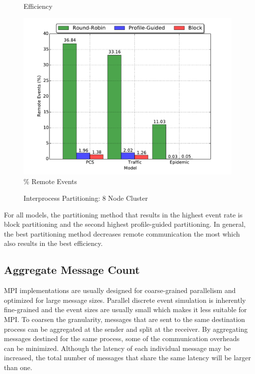 \documentclass[11pt]{book}
\begin{document}
\begin{figure}
\begin{minipage}{.5\textwidth}
\begin{center}
      Efficiency \\
    \end{center}
  \end{minipage}
  \centering
  \begin{minipage}{.5\textwidth}
    \begin{center}
      \includegraphics[width=\textwidth,keepaspectratio,quiet]{figs/partitioning_communication/partitioning_premote_8node.pdf} \\
      \% Remote Events \\
    \end{center}
  \end{minipage}
  \caption{Interprocess Partitioning: 8 Node Cluster}\label{partitioning_8node}
\end{figure}

For all models, the partitioning method that results in the highest event rate is block partitioning
and the second highest profile-guided partitioning.  In general, the best partitioning method
decreases remote communication the most which also results in the best efficiency.

\subsection{Aggregate Message Count}

MPI implementations are usually designed for coarse-grained parallelism and optimized for
large message sizes.  Parallel discrete event simulation is inherently fine-grained and the
event sizes are usually  small which makes it less suitable for MPI.  To coarsen the granularity,
messages that are sent to the same destination process can be aggregated at the sender and
split at the receiver.  By aggregating messages destined for the same process,  some of the
communication overheads can be minimized.  Although the latency of each individual message may
be increased, the total number of messages that share the same latency will be larger than one.
\end{document}
